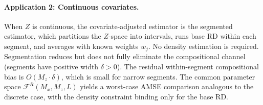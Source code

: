 \paragraph{Application 2: Continuous covariates.}
When $Z$ is continuous, the covariate-adjusted estimator is the segmented estimator, which partitions the $Z$-space into intervals, runs base RD within each segment, and averages with known weights $w_j$.
No density estimation is required.
Segmentation reduces but does not fully eliminate the compositional channel (segments have positive width $\delta > 0$).
The residual within-segment compositional bias is $O(M_z \cdot \delta)$, which is small for narrow segments.
The common parameter space $\mathcal{F}^R(M_x, M_z, L)$ yields a worst-case AMSE comparison analogous to the discrete case, with the density constraint binding only for the base RD.
